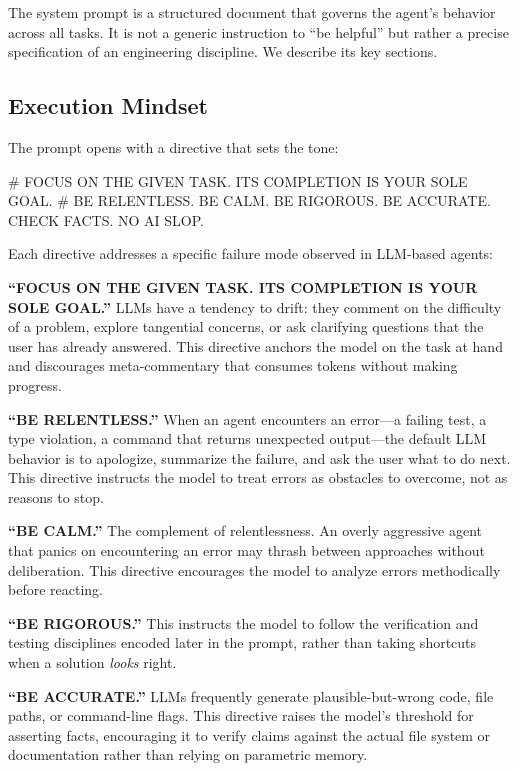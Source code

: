 \documentclass{article}
\begin{document}
The system prompt is a structured document that governs the agent's behavior across all tasks.  It is not a generic instruction to ``be helpful'' but rather a precise specification of an engineering discipline. We describe its key sections.

\subsection{Execution Mindset}

The prompt opens with a directive that sets the tone:

\begin{prompt}
# FOCUS ON THE GIVEN TASK. ITS COMPLETION IS YOUR SOLE GOAL.
# BE RELENTLESS. BE CALM. BE RIGOROUS. BE ACCURATE. CHECK FACTS. NO AI SLOP.
\end{prompt}

\noindent Each directive addresses a specific failure mode observed in
LLM-based agents:

\textbf{``FOCUS ON THE GIVEN TASK. ITS COMPLETION IS YOUR SOLE GOAL.''} LLMs have a tendency to drift: they comment on the difficulty of a problem, explore tangential concerns, or ask clarifying questions that the user has already answered.  This directive anchors the model on the task at hand and discourages meta-commentary that consumes tokens without making progress.

\textbf{``BE RELENTLESS.''} When an agent encounters an error---a failing test, a type violation, a command that returns unexpected output---the default LLM behavior is to apologize, summarize the failure, and ask the user what to do next.  This directive instructs the model to treat errors as obstacles to overcome, not as reasons to stop.

\textbf{``BE CALM.''} The complement of relentlessness.  An overly aggressive agent that panics on encountering an error may thrash between approaches without deliberation.  This directive encourages the model to analyze errors methodically before reacting.

\textbf{``BE RIGOROUS.''} This instructs the model to follow the verification and testing disciplines encoded later in the prompt, rather than taking shortcuts when a solution \emph{looks} right.

\textbf{``BE ACCURATE.''} LLMs frequently generate plausible-but-wrong code, file paths, or command-line flags.  This directive raises the model's threshold for asserting facts, encouraging it to verify claims against the actual file system or documentation rather than relying on parametric memory.
\end{document}
